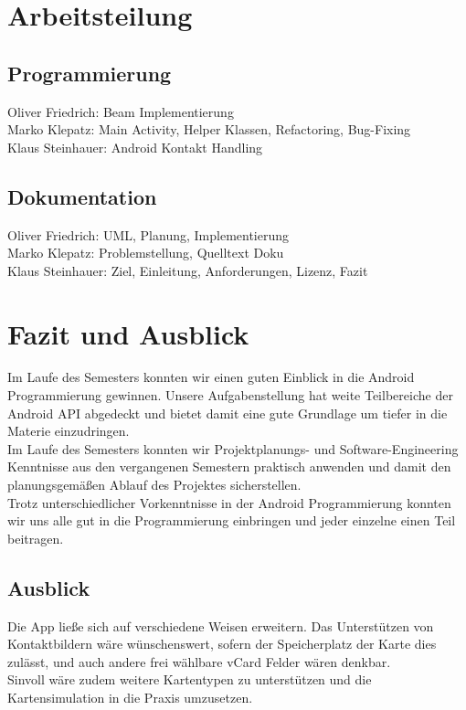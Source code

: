 \documentclass[a4paper,ngerman,12pt]{scrreprt}
\begin{document}
\chapter{Arbeitsteilung}
\section*{Programmierung}

Oliver Friedrich: Beam Implementierung \\ 
Marko Klepatz: Main Activity, Helper Klassen, Refactoring, Bug-Fixing\\
Klaus Steinhauer: Android Kontakt Handling\\ 

\section*{Dokumentation}

Oliver Friedrich: UML, Planung, Implementierung\\
Marko Klepatz: Problemstellung, Quelltext Doku\\
Klaus Steinhauer: Ziel, Einleitung, Anforderungen, Lizenz, Fazit\\

\chapter{Fazit und Ausblick}

Im Laufe des Semesters konnten wir einen guten Einblick in die Android Programmierung gewinnen. Unsere Aufgabenstellung hat weite Teilbereiche der Android API abgedeckt und bietet damit eine gute Grundlage um tiefer in die Materie einzudringen. \\
Im Laufe des Semesters konnten wir Projektplanungs-\/ und Software-Engineering Kenntnisse aus den vergangenen Semestern praktisch anwenden und damit den planungsgemäßen Ablauf des Projektes sicherstellen.\\ 
Trotz unterschiedlicher Vorkenntnisse in der Android Programmierung konnten wir uns alle gut in die Programmierung einbringen und jeder einzelne einen Teil beitragen.

\section{Ausblick}

Die App ließe sich auf verschiedene Weisen erweitern. Das Unterstützen von Kontaktbildern wäre wünschenswert, sofern der Speicherplatz der Karte dies zulässt, und auch andere frei wählbare vCard Felder wären denkbar. \\ Sinvoll wäre zudem weitere Kartentypen zu unterstützen und die Kartensimulation in die Praxis umzusetzen. 
\end{document}
